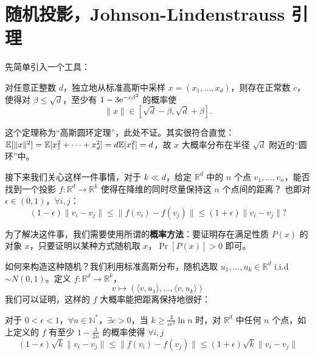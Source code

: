 \section{随机投影，Johnson-Lindenstrauss 引理}

先简单引入一个工具：

\begin{theorem}
    对任意正整数 $d$，独立地从标准高斯中采样 $x=(x_{1},\dots,x_{d})$，则存在正常数 $c$，使得对 $\beta\le\sqrt{d}$，至少有 $1-3\mathrm{e}^{-c\beta^{2}}$ 的概率使
    \[
    	\|x\| \in [\sqrt{d}-\beta, \sqrt{d}+\beta].
    \]
\end{theorem}

这个定理称为“高斯圆环定理”，此处不证。其实很符合直觉：$\mathbb{E}[\|x\|^{2}]=\mathbb{E}[x_{1}^{2}+\dots+x_{d}^{2}]=d\mathbb{E}[x_{1}^{2}]=d$，故 $x$ 大概率分布在半径 $\sqrt{d}$ 附近的“圆环”中。

接下来我们关心这样一件事情，对于 $k \ll d$，给定 $\mathbb{R}^{d}$ 中的 $n$ 个点 $v_{1}, \dots, v_{n}$，能否找到一个投影 $f: \mathbb{R}^{d}\longrightarrow \mathbb{R}^{k}$ 使得在降维的同时尽量保持这 $n$ 个点间的距离？
也即对 $\epsilon\in(0,1)$，$\forall i,j$：
\[
	(1-\epsilon)\|v_{i}-v_{j}\| \le \|f(v_{i})-f(v_{j})\| \le (1+\epsilon)\|v_{i}-v_{j}\| ?
\]

为了解决这件事，我们需要使用所谓的\textbf{概率方法}：要证明存在满足性质 $P(x)$ 的对象 $x$，只要证明以某种方式随机取 $x$，$\Pr[P(x)]>0$ 即可。

如何来构造这种随机？我们利用标准高斯分布，随机选取 $u_{1},\dots,u_{k} \in \mathbb{R}^{d}$ i.i.d $\sim N(0,1)$。定义 $f: \mathbb{R}^{d}\longrightarrow\mathbb{R}^{k}$，
\[
	v \mapsto (\langle v,u_{1}\rangle, \dots, \langle v,u_{k}\rangle)
\]
我们可以证明，这样的 $f$ 大概率能把距离保持地很好：

\begin{theorem}
    对于 $0<\epsilon<1$，$\forall n \in \mathbb{N}^*$，$\exists c>0$，当 $k\ge\frac{3}{c\epsilon^{2}}\ln n$ 时，对 $\mathbb{R}^{d}$ 中任何 $n$ 个点，如上定义的 $f$ 有至少 $1-\frac{3}{2n}$ 的概率使得 $\forall i,j$
    \[
    	(1-\epsilon)\sqrt{k}\|v_{i}-v_{j}\| \le \|f(v_{i})-f(v_{j})\| \le (1+\epsilon)\sqrt{k}\|v_{i}-v_{j}\|
    \]
\end{theorem}

